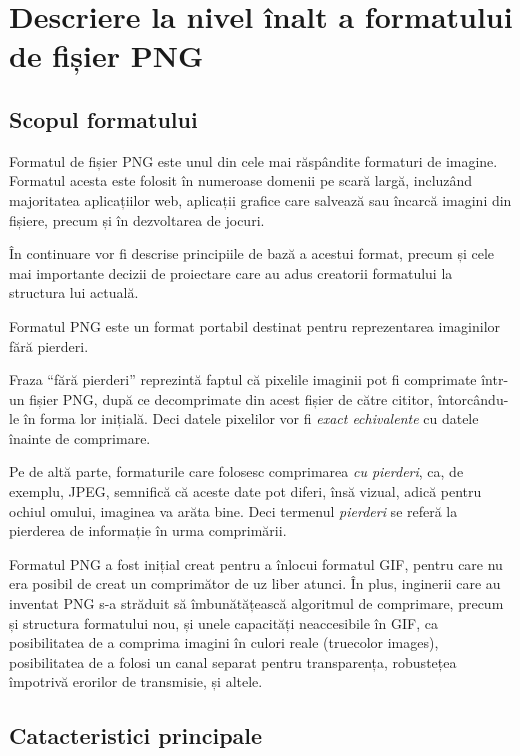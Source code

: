\documentclass[a4paper,12pt]{report}
\begin{document}
\section{Descriere la nivel înalt a formatului de fișier \acs{PNG}}

\subsection{Scopul formatului}

Formatul de fișier \ac{PNG} este unul din cele mai răspândite formaturi de imagine.
Formatul acesta este folosit în numeroase domenii pe scară largă, incluzând majoritatea aplicațiilor
web, aplicații grafice care salvează sau încarcă imagini din fișiere, precum și în dezvoltarea de jocuri.

În continuare vor fi descrise principiile de bază a acestui format,
precum și cele mai importante decizii de proiectare care au adus creatorii formatului la structura lui actuală.

Formatul \ac{PNG} este un format portabil destinat pentru reprezentarea imaginilor fără pierderi.

Fraza ``fără pierderi'' reprezintă faptul că pixelile imaginii
pot fi comprimate într-un fișier \ac{PNG},
după ce decomprimate din acest fișier de către cititor,
întorcându-le în forma lor inițială.
Deci datele pixelilor vor fi \textit{exact echivalente} cu datele înainte de comprimare.

Pe de altă parte, formaturile care folosesc comprimarea \textit{cu pierderi},
ca, de exemplu, \ac{JPEG}, semnifică că aceste date pot diferi,
însă vizual, adică pentru ochiul omului, imaginea va arăta bine.
Deci termenul \textit{pierderi} se referă la pierderea de informație în urma comprimării.

Formatul \ac{PNG} a fost inițial creat pentru a înlocui formatul \ac{GIF},
pentru care nu era posibil de creat un comprimător de uz liber atunci\cite{gif_unusable_reason}.
În plus, inginerii care au inventat \ac{PNG} s-a străduit să îmbunătățească algoritmul de comprimare,
precum și structura formatului nou, și unele capacități neaccesibile în \ac{GIF},
ca posibilitatea de a comprima imagini în culori reale (truecolor images),
posibilitatea de a folosi un canal separat pentru transparența,
robustețea împotrivă erorilor de transmisie, și altele.

\subsection{Catacteristici principale}
\end{document}
